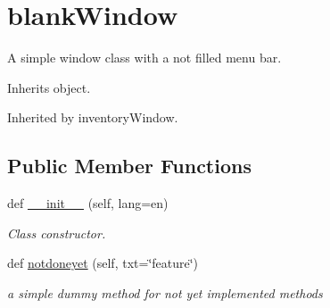 \hypertarget{classbackpack_1_1src_1_1gui_1_1window_1_1blankWindow}{}\section{blank\+Window}
\label{classbackpack_1_1src_1_1gui_1_1window_1_1blankWindow}


A simple window class with a not filled menu bar.  




Inherits object.



Inherited by inventory\+Window.

\subsection*{Public Member Functions}
\begin{DoxyCompactItemize}
\item 
def \mbox{\hyperlink{classbackpack_1_1src_1_1gui_1_1window_1_1blankWindow_a20b59d972f327eb73df9cc8a51e69a3c}{\+\_\+\+\_\+init\+\_\+\+\_\+}} (self, lang=\textquotesingle{}en\textquotesingle{})
\begin{DoxyCompactList}\small\item\em Class constructor. \end{DoxyCompactList}\item 
def \mbox{\hyperlink{classbackpack_1_1src_1_1gui_1_1window_1_1blankWindow_ac8036a5fd13297b7c43978a84da21336}{notdoneyet}} (self, txt=\char`\"{}feature\char`\"{})
\begin{DoxyCompactList}\small\item\em a simple dummy method for not yet implemented methods \end{DoxyCompactList}\end{DoxyCompactItemize}

